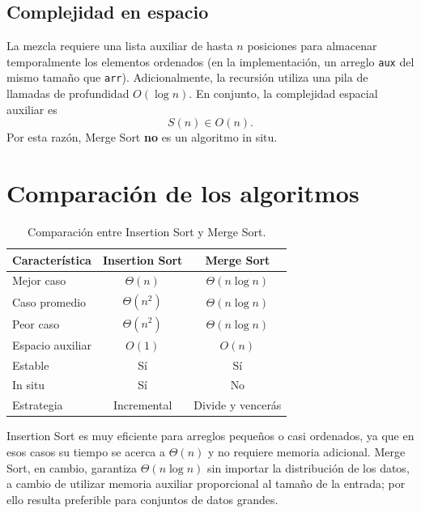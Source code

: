 \subsection{Complejidad en espacio}

La mezcla requiere una lista auxiliar de hasta $n$ posiciones para almacenar temporalmente los elementos ordenados (en la implementación, un arreglo \texttt{aux} del mismo tamaño que \texttt{arr}). Adicionalmente, la recursión utiliza una pila de llamadas de profundidad $O(\log n)$. En conjunto, la complejidad espacial auxiliar es
\[
  S(n) \in O(n).
\]
Por esta razón, Merge Sort \textbf{no} es un algoritmo in situ.

\section{Comparación de los algoritmos}

\begin{table}[h]
  \centering
  \caption{Comparación entre Insertion Sort y Merge Sort.}
  \begin{tabular}{lcc}
    \toprule
    \textbf{Característica} & \textbf{Insertion Sort} & \textbf{Merge Sort} \\
    \midrule
    Mejor caso            & $\Theta(n)$   & $\Theta(n \log n)$ \\
    Caso promedio         & $\Theta(n^2)$ & $\Theta(n \log n)$ \\
    Peor caso             & $\Theta(n^2)$ & $\Theta(n \log n)$ \\
    Espacio auxiliar      & $O(1)$        & $O(n)$ \\
    Estable               & Sí            & Sí \\
    In situ               & Sí            & No \\
    Estrategia            & Incremental   & Divide y vencerás \\
    \bottomrule
  \end{tabular}
\end{table}

Insertion Sort es muy eficiente para arreglos pequeños o casi ordenados, ya que en esos casos su tiempo se acerca a $\Theta(n)$ y no requiere memoria adicional. Merge Sort, en cambio, garantiza $\Theta(n \log n)$ sin importar la distribución de los datos, a cambio de utilizar memoria auxiliar proporcional al tamaño de la entrada; por ello resulta preferible para conjuntos de datos grandes.

